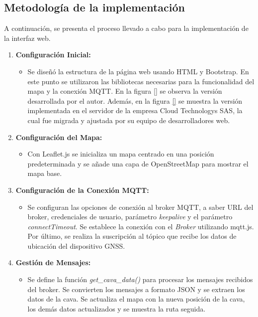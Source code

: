 \subsection{Metodología de la implementación}
\label{sec:met_web}

A continuación, se presenta el proceso llevado a cabo para la implementación de la interfaz web. 

\begin{enumerate}
	\item \textbf{Configuración Inicial:}
		\begin{itemize}
		\item Se diseñó la estructura de la página web usando HTML y Bootstrap. En este punto se utilizaron las bibliotecas necesarias para la funcionalidad del mapa y la conexión MQTT. En la figura \ref{} se observa la versión desarrollada por el autor. Además, en la figura \ref{} se muestra la versión implementada en el servidor de la empresa Cloud Technologys SAS, la cual fue migrada y ajustada por su equipo de desarrolladores web.
		\end{itemize}

	\item \textbf{Configuración del Mapa:}
		\begin{itemize}
		\item Con Leaflet.js se inicializa un mapa centrado en una posición predeterminada y se añade una capa de OpenStreetMap para mostrar el mapa base.
		\end{itemize}
		
	\item \textbf{Configuración de la Conexión MQTT:}
		\begin{itemize}
		\item Se configuran las opciones de conexión al broker MQTT, a saber URL del broker, credenciales de usuario, parámetro \textit{keepalive} y el parámetro \textit{connectTimeout}. Se establece la conexión con el \textit{Broker} utilizando mqtt.js. Por último, se realiza la suscripción  al tópico que recibe los datos de ubicación del dispositivo GNSS.
		\end{itemize}
	
	\item \textbf{Gestión de Mensajes:}
		\begin{itemize}
		\item Se define la función \textit{get\_cava\_data()} para procesar los mensajes recibidos del broker. Se convierten los mensajes a formato JSON y se extraen los datos de la cava. Se actualiza el mapa con la nueva posición de la cava, los demás datos actualizados y se muestra la ruta seguida.
		\end{itemize}
		

\end{enumerate}
